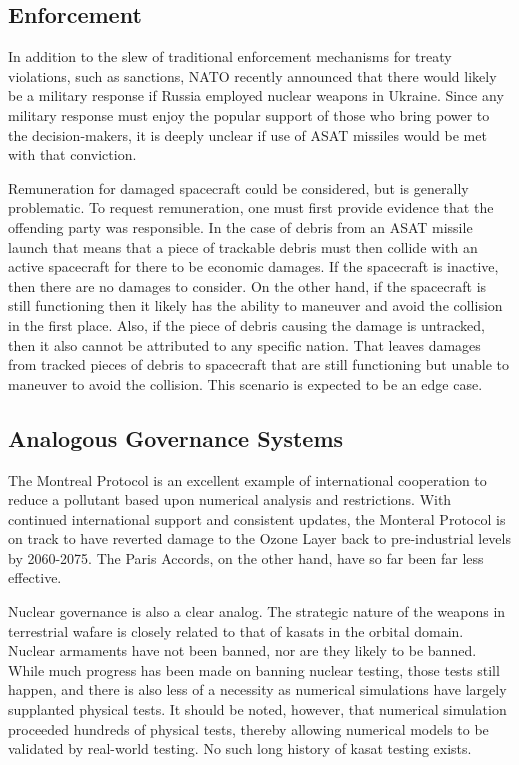 \subsection{Enforcement}
In addition to the slew of traditional enforcement mechanisms for
treaty violations, such as sanctions, NATO recently announced that
there would likely be a military response if Russia employed nuclear
weapons in Ukraine.  Since any military response must enjoy the
popular support of those who bring power to the decision-makers, it is
deeply unclear if use of ASAT missiles would be met with that
conviction.

Remuneration for damaged spacecraft could be considered, but is
generally problematic.  To request remuneration, one must first
provide evidence that the offending party was responsible.  In the
case of debris from an ASAT missile launch that means that a piece of
trackable debris must then collide with an active spacecraft for there
to be economic damages.  If the spacecraft is inactive, then there are
no damages to consider.  On the other hand, if the spacecraft is still
functioning then it likely has the ability to maneuver and avoid the
collision in the first place.  Also, if the piece of debris causing
the damage is untracked, then it also cannot be attributed to any
specific nation.  That leaves damages from tracked pieces of debris to
spacecraft that are still functioning but unable to maneuver to avoid
the collision.  This scenario is expected to be an edge case.


\subsection{Analogous Governance Systems}


The Montreal Protocol is an excellent example of international
cooperation to reduce a pollutant based upon numerical analysis and
restrictions.\cite{oh-canada} With continued international support and
consistent updates, the Monteral Protocol is on track to have reverted
damage to the Ozone Layer back to pre-industrial levels by
2060-2075.\cite{oh-canada}  The Paris Accords, on the other hand, have
so far been far less effective.\cite{lousy-paris}

Nuclear governance is also a clear analog.  The strategic nature of
the weapons in terrestrial wafare is closely related to that of
\acp{kasat} in the orbital domain.  Nuclear armaments have not been
banned, nor are they likely to be banned.  While much progress has
been made on banning nuclear testing, those tests still happen, and
there is also less of a necessity as numerical simulations have
largely supplanted physical tests.  It should be noted, however, that
numerical simulation proceeded hundreds of physical tests, thereby
allowing numerical models to be validated by real-world testing.  No
such long history of \ac{kasat} testing exists.
